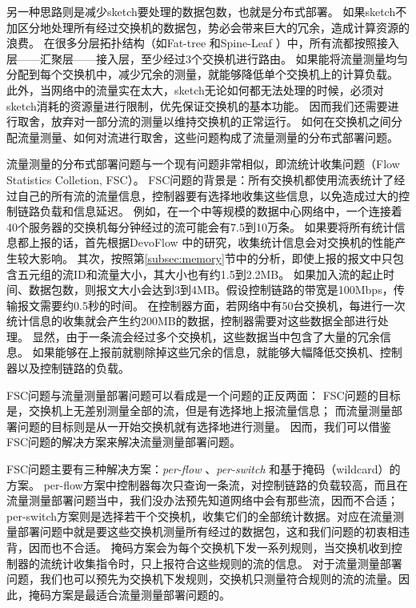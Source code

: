 另一种思路则是减少sketch要处理的数据包数，也就是分布式部署。
如果sketch不加区分地处理所有经过交换机的数据包，势必会带来巨大的冗余，造成计算资源的浪费。
在很多分层拓扑结构（如Fat-tree \cite{al2008scalable}和Spine-Leaf \cite{alizadeh2013data}）中，所有流都按照接入层——汇聚层——接入层，至少经过3个交换机进行路由。
如果能将流量测量均匀分配到每个交换机中，减少冗余的测量，就能够降低单个交换机上的计算负载。
此外，当网络中的流量实在太大，sketch无论如何都无法处理的时候，必须对sketch消耗的资源量进行限制，优先保证交换机的基本功能。
因而我们还需要进行取舍，放弃对一部分流的测量以维持交换机的正常运行。
如何在交换机之间分配流量测量、如何对流进行取舍，这些问题构成了流量测量的分布式部署问题。

流量测量的分布式部署问题与一个现有问题非常相似，即流统计收集问题（Flow Statistics Colletion, FSC）。
FSC问题的背景是：所有交换机都使用流表统计了经过自己的所有流的流量信息，控制器要有选择地收集这些信息，以免造成过大的控制链路负载和信息延迟。
例如，在一个中等规模的数据中心网络中\cite{kannan2013compact}，一个连接着40个服务器的交换机每分钟经过的流可能会有7.5到10万条。
如果要将所有统计信息都上报的话，首先根据DevoFlow \cite{curtis2011devoflow}中的研究，收集统计信息会对交换机的性能产生较大影响。
其次，按照第\ref{subsec:memory}节中的分析，即使上报的报文中只包含五元组的流ID和流量大小，其大小也有约1.5到2.2MB。
如果加入流的起止时间、数据包数，则报文大小会达到3到4MB。假设控制链路的带宽是100Mbps，传输报文需要约0.5秒的时间。
在控制器方面，若网络中有50台交换机，每进行一次统计信息的收集就会产生约200MB的数据，控制器需要对这些数据全部进行处理。
显然，由于一条流会经过多个交换机，这些数据当中包含了大量的冗余信息。
如果能够在上报前就剔除掉这些冗余的信息，就能够大幅降低交换机、控制器以及控制链路的负载。

FSC问题与流量测量部署问题可以看成是一个问题的正反两面：
FSC问题的目标是，交换机上无差别测量全部的流，但是有选择地上报流量信息；
而流量测量部署问题的目标则是从一开始交换机就有选择地进行测量。
因而，我们可以借鉴FSC问题的解决方案来解决流量测量部署问题。

FSC问题主要有三种解决方案：\emph{per-flow} \cite{van2014opennetmon}、\emph{per-switch} \cite{su2014flowcover}\cite{su2015cemon}和基于掩码（wildcard）的方案\cite{xu2017miniming}。
per-flow方案中控制器每次只查询一条流，对控制链路的负载较高，而且在流量测量部署问题当中，我们没办法预先知道网络中会有那些流，因而不合适；
per-switch方案则是选择若干个交换机，收集它们的全部统计数据。对应在流量测量部署问题中就是要这些交换机测量所有经过的数据包，这和我们问题的初衷相违背，因而也不合适。
掩码方案会为每个交换机下发一系列规则，当交换机收到控制器的流统计收集指令时，只上报符合这些规则的流的信息。
对于流量测量部署问题，我们也可以预先为交换机下发规则，交换机只测量符合规则的流的流量。因此，掩码方案是最适合流量测量部署问题的。


